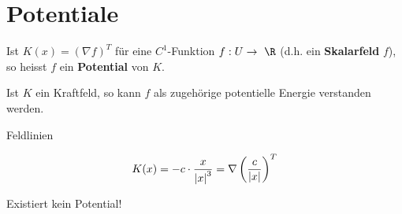 \section{Potentiale}
\begin{def*}[note = Potential , index = Potential]
	Ist $K(x) = (\nabla f)^T$ für eine $C^1$-Funktion $f : U \rightarrow \R$ (d.h. ein \textbf{Skalarfeld} $f$), so heisst $f$ ein \textbf{Potential} von $K$.
\end{def*}
\begin{bem}
	Ist $K$ ein Kraftfeld, so kann $f$ als zugehörige potentielle Energie verstanden werden.
\end{bem}
\begin{bem}
	Feldlinien
\end{bem}
\begin{bsp*}[note = 2]
	\[ K(x) = -c \cdot \frac{x}{\abs{x}^3} = \nabla \left( \frac{c}{\abs{x}} \right)^T \]
\end{bsp*}
\begin{bsp*}[note = {3,4}]
	Existiert kein Potential!
\end{bsp*}

